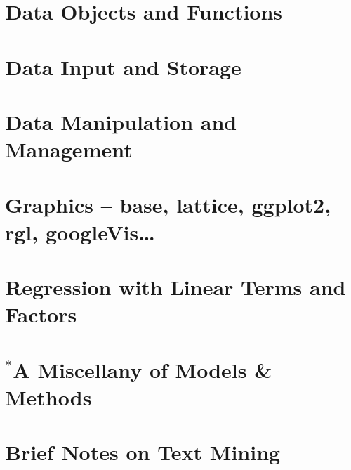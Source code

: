 \documentclass{tufte-book}\usepackage[]{graphicx}\usepackage[]{color}
\begin{document}
\chapter{Data Objects and Functions}



\chapter{Data Input and Storage}\label{ch:input}


\chapter{Data Manipulation and Management}\label{ch:manip}


\chapter{Graphics -- base, lattice, ggplot2, rgl, googleVis\ldots}\label{ch:plots}



\chapter{Regression with Linear Terms and Factors}


\chapter[A Miscellany of Models \& Methods]{$^*$A Miscellany of Models \& Methods}


% 

\chapter{Brief Notes on Text Mining}\label{ch:tm}

\end{document}
